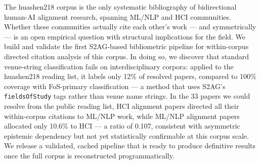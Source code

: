 The huashen218 corpus is the only systematic bibliography of bidirectional human-AI alignment research, spanning ML/NLP and HCI communities.
Whether these communities actually cite each other's work --- and symmetrically --- is an open empirical question with structural implications for the field.
We build and validate the first S2AG-based bibliometric pipeline for within-corpus directed citation analysis of this corpus.
In doing so, we discover that standard venue-string classification fails on interdisciplinary corpora: applied to the huashen218 reading list, it labels only 12\% of resolved papers, compared to 100\% coverage with FoS-primary classification --- a method that uses S2AG's \texttt{fieldsOfStudy} tags rather than venue name strings.
In the 33 papers we could resolve from the public reading list, HCI alignment papers directed all their within-corpus citations to ML/NLP work, while ML/NLP alignment papers allocated only 10.6\% to HCI --- a ratio of 0.107, consistent with asymmetric epistemic dependency but not yet statistically confirmable at this corpus scale.
We release a validated, cached pipeline that is ready to produce definitive results once the full corpus is reconstructed programmatically.
